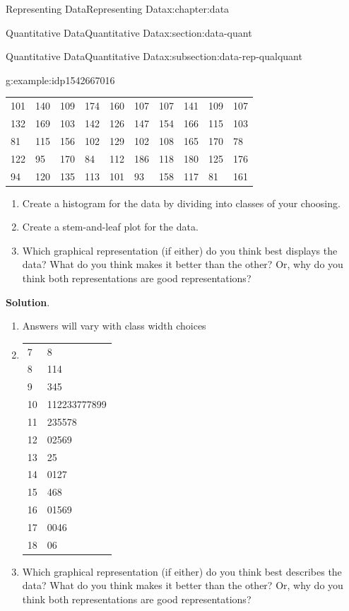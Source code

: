 \documentclass[oneside,10pt,]{book}
\newcommand{\blocktitlefont}{\relax}
\newcommand{\tabularfont}{\relax}
\begin{document}
\begin{chapterptx}{Representing Data}{}{Representing Data}{}{}{x:chapter:data}
\begin{sectionptx}{Quantitative Data}{}{Quantitative Data}{}{}{x:section:data-quant}
\begin{subsectionptx}{Quantitative Data}{}{Quantitative Data}{}{}{x:subsection:data-rep-qualquant}
\begin{example}{}{g:example:idp1542667016}
\begin{center}
{\begin{tabular}{llllllllll}
101&140&109&174&160&107&107&141&109&107\tabularnewline[0pt]
132&169&103&142&126&147&154&166&115&103\tabularnewline[0pt]
81&115&156&102&129&102&108&165&170&78\tabularnewline[0pt]
122&95&170&84&112&186&118&180&125&176\tabularnewline[0pt]
94&120&135&113&101&93&158&117&81&161
\end{tabular}
}%
\end{center}%
%
\par
%
\begin{enumerate}[label=\alph*]
\item{}Create a histogram for the data by dividing into classes of your choosing.%
\item{}Create a stem-and-leaf plot for the data.%
\item{}Which graphical representation (if either) do you think best displays the data?  What do you think makes it better than the other? Or, why do you think both representations are good representations?%
\end{enumerate}
%
\par\smallskip%
\noindent\textbf{\blocktitlefont Solution}.\hypertarget{g:solution:idp1542679176}{}\quad{}%
\begin{enumerate}[label=\alph*]
\item{}Answers will vary with class width choices%
\item{}\begin{center}%
{\tabularfont%
\begin{tabular}{ll}
7&8\tabularnewline[0pt]
8&114\tabularnewline[0pt]
9&345\tabularnewline[0pt]
10&112233777899\tabularnewline[0pt]
11&235578\tabularnewline[0pt]
12&02569\tabularnewline[0pt]
13&25\tabularnewline[0pt]
14&0127\tabularnewline[0pt]
15&468\tabularnewline[0pt]
16&01569\tabularnewline[0pt]
17&0046\tabularnewline[0pt]
18&06
\end{tabular}
}%
\end{center}%
%
\item{}Which graphical representation (if either) do you think best describes the data?  What do you think makes it better than the other? Or, why do you think both representations are good representations?%
\end{enumerate}
%
\end{example}
\end{subsectionptx}
\end{sectionptx}
%
%
\typeout{************************************************}

\end{chapterptx}
\end{document}
